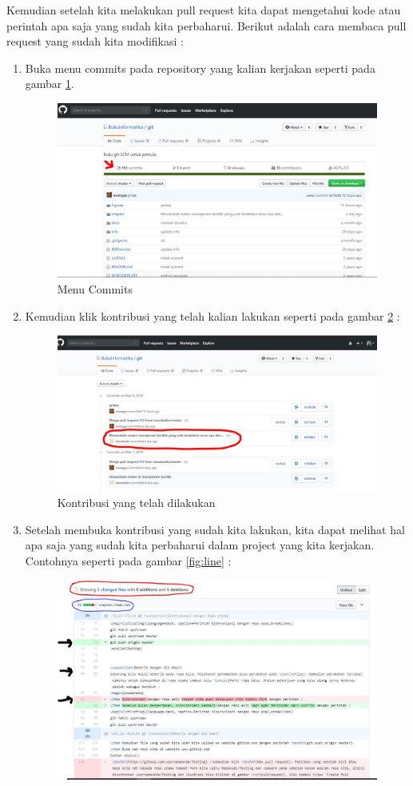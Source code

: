 Kemudian setelah kita melakukan pull request kita dapat mengetahui kode atau perintah apa saja yang sudah kita perbaharui. Berikut adalah cara membaca pull request yang sudah kita modifikasi :
\begin{enumerate}
\item Buka menu commits pada repository yang kalian kerjakan seperti pada gambar \ref{fig:commits}.
\subitem
\begin{figure}[!htbp]
\centerline{\includegraphics[width=.75\textwidth]{Figures/membacapr/commits.JPG}}
\caption{Menu Commits}
\label{fig:commits}
\end{figure}
\item Kemudian klik kontribusi yang telah kalian lakukan seperti pada gambar \ref{fig:file} :
\subitem
\begin{figure}[!htbp]
\centerline{\includegraphics[width=.75\textwidth]{Figures/membacapr/file.JPG}}
\caption{Kontribusi yang telah dilakukan}
\label{fig:file}
\end{figure}
\item Setelah membuka kontribusi yang sudah kita lakukan, kita dapat melihat hal apa saja yang sudah kita perbaharui dalam project yang kita kerjakan. Contohnya seperti pada gambar \ref{fig:line} :
\subitem
\begin{figure}[!htbp]
\centerline{\includegraphics[width=.75\textwidth]{Figures/membacapr/line.JPG}}

\end{figure}
\end{enumerate}
